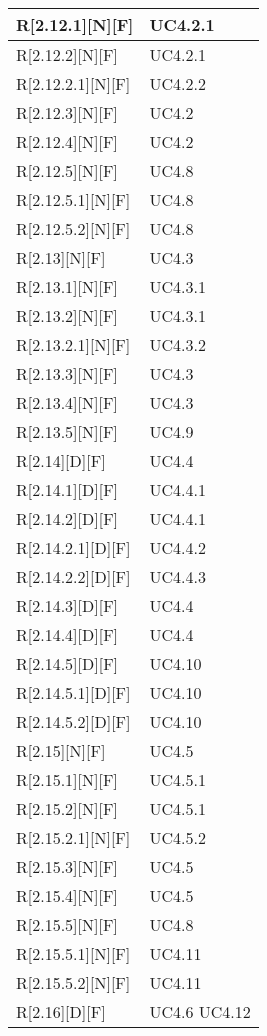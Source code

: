 \begin{longtable}{X | X}
\hline
R[2.12.1][N][F] & UC4.2.1 \\
\hline
R[2.12.2][N][F] & UC4.2.1 \\
\hline
R[2.12.2.1][N][F] & UC4.2.2 \\
\hline
R[2.12.3][N][F] & UC4.2 \\
\hline
R[2.12.4][N][F] & UC4.2 \\
\hline
R[2.12.5][N][F] & UC4.8 \\
\hline
R[2.12.5.1][N][F] & UC4.8 \\
\hline
R[2.12.5.2][N][F] & UC4.8 \\
\hline
R[2.13][N][F] & UC4.3 \\
\hline
R[2.13.1][N][F] & UC4.3.1 \\
\hline
R[2.13.2][N][F] & UC4.3.1 \\
\hline
R[2.13.2.1][N][F] & UC4.3.2 \\
\hline
R[2.13.3][N][F] & UC4.3 \\
\hline
R[2.13.4][N][F] & UC4.3 \\
\hline
R[2.13.5][N][F] & UC4.9 \\
\hline
R[2.14][D][F] & UC4.4 \\
\hline
R[2.14.1][D][F] & UC4.4.1 \\
\hline
R[2.14.2][D][F] & UC4.4.1 \\
\hline
R[2.14.2.1][D][F] & UC4.4.2 \\
\hline
R[2.14.2.2][D][F] & UC4.4.3 \\
\hline
R[2.14.3][D][F] & UC4.4 \\
\hline
R[2.14.4][D][F] & UC4.4 \\
\hline
R[2.14.5][D][F] & UC4.10 \\
\hline
R[2.14.5.1][D][F] & UC4.10 \\
\hline
R[2.14.5.2][D][F] & UC4.10 \\
\hline
R[2.15][N][F] & UC4.5 \\
\hline
R[2.15.1][N][F] & UC4.5.1 \\
\hline
R[2.15.2][N][F] & UC4.5.1 \\
\hline
R[2.15.2.1][N][F] & UC4.5.2 \\
\hline
R[2.15.3][N][F] & UC4.5 \\
\hline
R[2.15.4][N][F] & UC4.5 \\
\hline
R[2.15.5][N][F] & UC4.8 \\
\hline
R[2.15.5.1][N][F] & UC4.11 \\
\hline
R[2.15.5.2][N][F] & UC4.11 \\
\hline
R[2.16][D][F] & UC4.6 \newline UC4.12 \\

\end{longtable}
